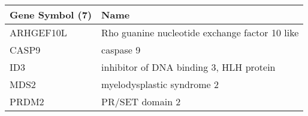 \begin{tabular}{ll}
\toprule
Gene Symbol (7) &                                           Name \\
\midrule
      ARHGEF10L & Rho guanine nucleotide exchange factor 10 like \\
          CASP9 &                                      caspase 9 \\
            ID3 &        inhibitor of DNA binding 3, HLH protein \\
           MDS2 &                     myelodysplastic syndrome 2 \\
          PRDM2 &                                PR/SET domain 2 \\
\bottomrule
\end{tabular}
